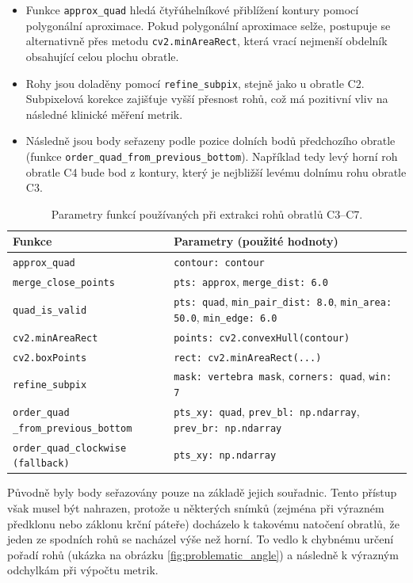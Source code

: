 \documentclass[male,czech,api_bc]{kitheses}
\begin{document}
\begin{itemize}
  \item Funkce \texttt{approx\_quad} hledá čtyřúhelníkové přiblížení kontury pomocí polygonální aproximace. Pokud polygonální aproximace selže, postupuje se alternativně přes metodu \texttt{cv2.\-minArea\-Rect}, která vrací nejmenší obdelník obsahující celou plochu obratle.
  \item Rohy jsou doladěny pomocí \texttt{refine\_subpix}, stejně jako u obratle C2. Subpixelová korekce zajišťuje vyšší přesnost rohů, což má pozitivní vliv na následné klinické měření metrik.
  \item Následně jsou body seřazeny podle pozice dolních bodů předchozího obratle (funkce \texttt{order\_quad\_from\_previous\_bottom}). Například tedy levý horní roh obratle C4 bude bod z kontury, který je nejbližší levému dolnímu rohu obratle C3.
\end{itemize}

\begin{table}[H]
\centering
\caption{Parametry funkcí používaných při extrakci rohů obratlů C3--C7.}
\label{tab:c3_c7_extraction_params}
\begin{tabular}{p{5.2cm} p{8cm}}
\toprule
\textbf{Funkce} & \textbf{Parametry (použité hodnoty)} \\
\midrule
\texttt{approx\_quad} & \texttt{contour: contour} \\
\texttt{merge\_close\_points} & \texttt{pts: approx}, \texttt{merge\_dist: 6.0} \\
\texttt{quad\_is\_valid} & \texttt{pts: quad}, \texttt{min\_pair\_dist: 8.0}, \texttt{min\_area: 50.0}, \texttt{min\_edge: 6.0} \\
\texttt{cv2.minAreaRect} & \texttt{points: cv2.convexHull(contour)} \\
\texttt{cv2.boxPoints} & \texttt{rect: cv2.minAreaRect(...)} \\
\texttt{refine\_subpix} & \texttt{mask: vertebra mask}, \texttt{corners: quad}, \texttt{win: 7} \\
\texttt{order\_quad \_from\_previous\_bottom} & \texttt{pts\_xy: quad}, \texttt{prev\_bl: np.ndarray}, \texttt{prev\_br: np.ndarray} \\
\texttt{order\_quad\_clockwise (fallback)} & \texttt{pts\_xy: np.ndarray} \\
\bottomrule
\end{tabular}
\end{table}

Původně byly body seřazovány pouze na základě jejich souřadnic. Tento přístup však musel být nahrazen, protože u některých snímků (zejména při výrazném předklonu nebo záklonu krční páteře) docházelo k takovému natočení obratlů, že jeden ze spodních rohů se nacházel výše než horní. To vedlo k chybnému určení pořadí rohů (ukázka na obrázku \ref{fig:problematic_angle}) a následně k výrazným odchylkám při výpočtu metrik.
\end{document}
